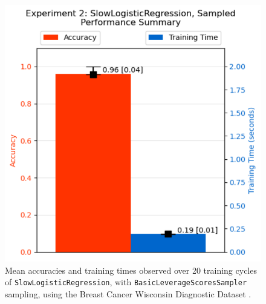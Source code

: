 \documentclass{article}
\theoremstyle{plain}
\theoremstyle{definition}
\theoremstyle{remark}
\begin{document}
\begin{figure}[ht]
\vskip 0.2in
\begin{center}
\centerline{\includegraphics[width=\columnwidth]{experiment_2b}}
\caption{Mean accuracies and training times observed over 20 training cycles of \texttt{SlowLogisticRegression}, with \texttt{BasicLeverageScoresSampler} sampling, using the Breast Cancer Wisconsin Diagnostic Dataset \cite{breastcancer}.}
\label{experiment_1a}
\end{center}
\vskip -0.2in
\end{figure}
\end{document}
